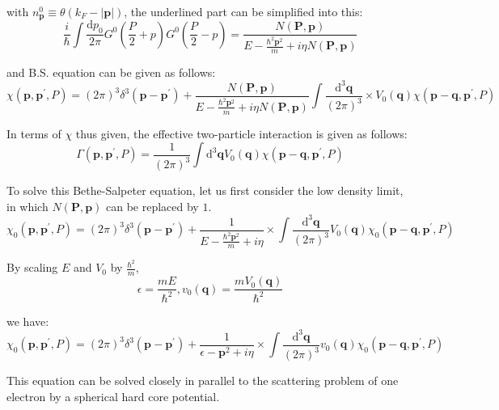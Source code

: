 with $n_\mathbf{p}^0 \equiv \theta(k_F-|\mathbf{p}|)$, the underlined part can be simplified into this:
\[ \frac{i}{\hbar} \int \frac{\mathrm{d}p_0}{2\pi}G^0(\frac{P}{2}+p)G^0(\frac{P}{2}-p) = \frac{N(\mathbf{P},\mathbf{p})}{E-\frac{\hbar^2\mathbf{p}^2}{m}+i\eta N(\mathbf{P},\mathbf{p})} \]

and B.S. equation can be given as follows:
\begin{equation} \label{Eqs2.7.16}
\chi(\mathbf{p},\mathbf{p}^{'},P) = (2\pi)^3 \delta^3(\mathbf{p}-\mathbf{p}^{'}) + \frac{N(\mathbf{P},\mathbf{p})}{E-\frac{\hbar^2\mathbf{p}^2}{m}+i\eta N(\mathbf{P},\mathbf{p})}\int \frac{\mathrm{d}^3 \mathbf{q}}{(2\pi)^3} \times V_0(\mathbf{q})\chi(\mathbf{p}-\mathbf{q},\mathbf{p}^{'},P) \end{equation}

In terms of $\chi$ thus given, the effective two-particle interaction is given as follows:
\begin{equation} \label{Eqs2.7.17}
\Gamma(\mathbf{p},\mathbf{p}^{'},P) = \frac{1}{(2\pi)^3} \int \mathrm{d}^3 \mathbf{q} V_0(\mathbf{q}) \chi(\mathbf{p}-\mathbf{q},\mathbf{p}^{'},P) \end{equation}

To solve this Bethe-Salpeter equation, let us first consider the low density limit, in which $N(\mathbf{P},\mathbf{p})$ can be replaced by $1$.
\begin{equation} \label{Eqs2.7.18}
\chi_0(\mathbf{p},\mathbf{p}^{'},P) = (2\pi)^3 \delta^3(\mathbf{p}-\mathbf{p}^{'}) + \frac{1}{E-\frac{\hbar^2\mathbf{p}^2}{m}+i\eta}\times \int \frac{\mathrm{d}^3\mathbf{q}}{(2\pi)^3}V_0(\mathbf{q})\chi_0(\mathbf{p}-\mathbf{q},\mathbf{p}^{'},P) \end{equation}

By scaling $E$ and $V_0$ by $\frac{\hbar^2}{m}$,
\begin{equation} \label{Eqs2.7.19}
\epsilon = \frac{mE}{\hbar^2}, v_0(\mathbf{q}) = \frac{m V_0(\mathbf{q})}{\hbar^2} \end{equation}

we have:
\begin{equation*} \label{Eqs2.7.18'} \tag{2.7.18'}
\chi_0(\mathbf{p},\mathbf{p}^{'},P) = (2\pi)^3\delta^3(\mathbf{p}-\mathbf{p}^{'}) + \frac{1}{\epsilon-\mathbf{p}^2+i\eta}\times\int\frac{\mathrm{d}^3\mathbf{q}}{(2\pi)^3}v_0(\mathbf{q}) \chi_0(\mathbf{p}-\mathbf{q},\mathbf{p}^{'},P)
\end{equation*}

This equation can be solved closely in parallel to the scattering problem of one electron by a spherical hard core potential.

